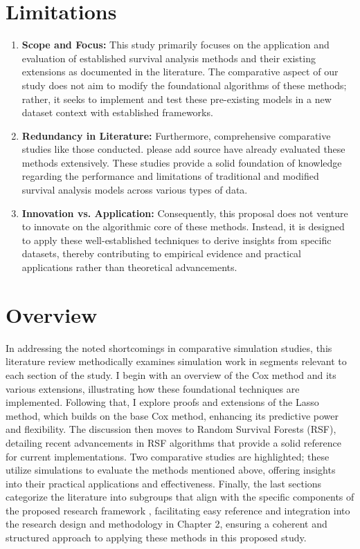 \section{Limitations}
\begin{enumerate}
	\item \textbf{Scope and Focus:} This study primarily focuses on the application and evaluation of established survival analysis methods and their existing extensions as documented in the literature. The comparative aspect of our study does not aim to modify the foundational algorithms of these methods; rather, it seeks to implement and test these pre-existing models in a new dataset context with established frameworks.
	\item \textbf{Redundancy in Literature:} Furthermore, comprehensive comparative studies like those conducted. please add source have already evaluated these methods extensively. These studies provide a solid foundation of knowledge regarding the performance and limitations of traditional and modified survival analysis models across various types of data.
	\item \textbf{Innovation vs. Application:} Consequently, this proposal does not venture to innovate on the algorithmic core of these methods. Instead, it is designed to apply these well-established techniques to derive insights from specific datasets, thereby contributing to empirical evidence and practical applications rather than theoretical advancements.
\end{enumerate}

\section{Overview}
\noindent
In addressing the noted shortcomings in comparative simulation studies, this literature review methodically examines simulation work in segments relevant to each section of the study. I begin with an overview of the Cox method and its various extensions, illustrating how these foundational techniques are implemented. Following that, I explore proofs and extensions of the Lasso method, which builds on the base Cox method, enhancing its predictive power and flexibility. The discussion then moves to Random Survival Forests (RSF), detailing recent advancements in RSF algorithms that provide a solid reference for current implementations. Two comparative studies are highlighted; these utilize simulations to evaluate the methods mentioned above, offering insights into their practical applications and effectiveness. Finally, the last sections categorize the literature into subgroups that align with the specific components of the proposed research framework \parencite{pawel_pitfalls_2024} \parencite{morris_using_2019}, facilitating easy reference and integration into the research design and methodology in Chapter 2, ensuring a coherent and structured approach to applying these methods in this proposed study.
